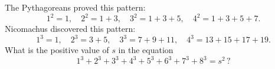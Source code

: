 The Pythagoreans proved this pattern:
\[1^2=1,\quad2^2=1+3,\quad3^2=1+3+5,\quad4^2=1+3+5+7.\]
Nicomachus discovered this pattern:
\[1^3=1,\quad2^3=3+5,\quad3^3=7+9+11,\quad4^3=13+15+17+19.\]
What is the positive value of $s$ in the equation
\[1^3+2^3+3^3+4^3+5^3+6^3+7^3+8^3=s^2\,?\]
